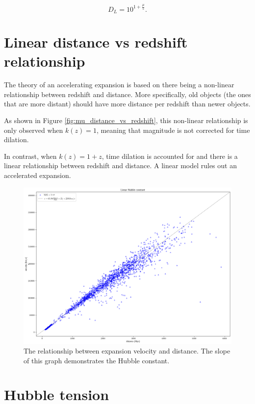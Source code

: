 \documentclass{article}
\begin{document}
\begin{equation}
  D_L = 10^{1 + \frac{\mu}{5}}.
\end{equation}

\section{Linear distance vs redshift relationship}
\label{hubblelaw}

The theory of an accelerating expansion is based on there being a non-linear
relationship between redshift and distance. More specifically, old objects (the
ones that are more distant) should have more distance per redshift than newer
objects.

As shown in Figure \ref{fig:mu_distance_vs_redshift}, this non-linear
relationship is only observed when $k(z) = 1$, meaning that magnitude is not
corrected for time dilation.

In contrast, when $k(z) = 1 + z$, time dilation is accounted for and there is a
linear relationship between redshift and distance. A linear model rules out an
accelerated expansion.

\begin{figure}[ht]
  \includegraphics[width=\linewidth]{velocity_vs_distance.png}
  \caption{The relationship between expansion velocity and distance. The slope of this graph demonstrates the Hubble constant.
  }
\end{figure}

\section{Hubble tension}
\label{sec:tension}
\end{document}
